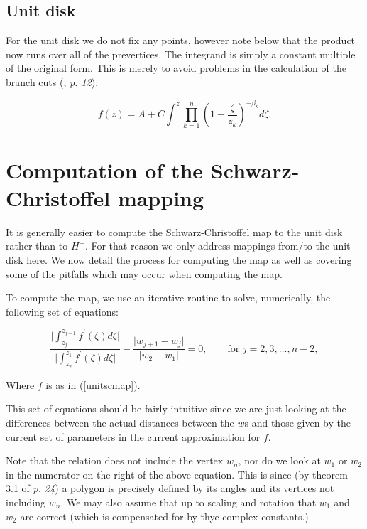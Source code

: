 \documentclass[a4paper,10pt]{amsart}
\newcommand{\sch}{Schwarz-Christoffel }
\begin{document}
\subsection{Unit disk}

For the unit disk we do not fix any points, however note below that the product now runs over all of the prevertices. The integrand is simply a constant multiple of the original form. This is merely to avoid problems in the calculation of the branch cuts (\cite{driscoll}, \emph{p. 12}).

\begin{equation}
\label{unitscmap}
f(z) = A + C \int^z \prod_{k=1}^{n} (1 - \frac{\zeta}{z_k})^{-\beta_k} d\zeta.
\end{equation}






\section{Computation of the \sch mapping}

It is generally easier to compute the \sch map to the unit disk rather than to $H^+$. For that reason we only address mappings from/to the unit disk here. We now detail the process for computing the map as well as covering some of the pitfalls which may occur when computing the map.

To compute the map, we use an iterative routine to solve, numerically, the following set of equations:

\begin{equation}
\label{optimizeme}
\frac{\vert \int_{z_j}^{z_{j+1}} f^\prime(\zeta) d\zeta \vert}{\vert \int_{z_2}^{z_{1}} f^\prime(\zeta) d\zeta\vert} - \frac{\vert w_{j+1} - w_j\vert}{\vert w_2 - w_1\vert} = 0, \qquad \text{for } j=2,3,\dots,n-2,
\end{equation}

Where $f$ is as in (\ref{unitscmap}).

This set of equations should be fairly intuitive since we are just looking at the differences between the actual distances between the $w$s and those given by the current set of parameters in the current approximation for $f$.

Note that the relation does not include the vertex $w_n$, nor do we look at $w_1$ or $w_2$ in the numerator on the right of the above equation. This is since (by theorem 3.1 of \cite{driscoll} \emph{p. 24}) a polygon is precisely defined by its angles and its vertices not including $w_n$. We may also assume that up to scaling and rotation that $w_1$ and $w_2$ are correct (which is compensated for by thye complex constants.)
\end{document}
